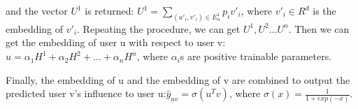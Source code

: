 \documentclass{article}
\begin{document}
and the vector $U^1$ is returned: $U^1=\sum_{(u'_i,v'_i)\in E^1_u} p_i v'_i$, where $v'_i \in R^d$ is the embedding of $v'_i$. Repeating the procedure, we can get $U^1,U^2...U^n$. Then we can get the embedding of user u with respect to user v: $u=\alpha_1 H^1+\alpha_2 H^2+...+\alpha_n H^n$, where $\alpha_i$s are positive trainable parameters.\\
\par Finally, the embedding of u and the embedding of v are combined to output the predicted user v's influence to user u:$\hat{y}_{uv}=\sigma(u^T v)$, where $\sigma(x)=\frac{1}{1+exp(-x)}$.
\end{document}
